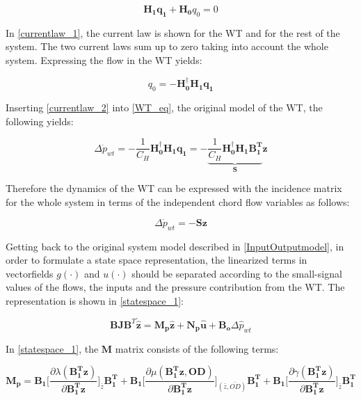 \begin{equation}
 \bm{H_1}\bm{q_1} + \bm{H_0}q_0 = 0 
 \label{currentlaw_1}
\end{equation}

In \eqref{currentlaw_1}, the current law is shown for the WT and for the rest of the system. The two current laws sum up to zero taking into account the whole system. Expressing the flow in the WT yields:

\begin{equation}
q_0 = -\bm{H^{\dagger}_0}\bm{H_1}\bm{q_1}
 \label{currentlaw_2}
\end{equation}

Inserting \eqref{currentlaw_2} into \eqref{WT_eq}, the original model of the WT, the following yields:

\begin{equation}
\Delta \dot{p}_{wt} = - \frac{1}{C_H} \bm{H^{\dagger}_0}\bm{H_1}\bm{q_1} = - \underbrace{\frac{1}{C_H} \bm{H^{\dagger}_0}\bm{H_1}\bm{{B_1^{T}}}}_{\bm{S}} \bm{z}
 \label{currentlaw_3}
\end{equation}

Therefore the dynamics of the WT can be expressed with the incidence matrix for the whole system in terms of the independent chord flow variables as follows: 

\begin{equation}
\Delta \dot{p}_{wt} = - \bm{S} \bm{z}
 \label{currentlaw_4}
\end{equation}

Getting back to the original system model described in \eqref{InputOutputmodel}, in order to formulate a state space representation, the linearized terms in  vectorfields $g(\cdot)$ and $u(\cdot)$ should be separated according to the small-signal values of the flows, the inputs and the pressure contribution from the WT. The representation is shown in \eqref{statespace_1}: 

\begin{equation}
 \bm{B}\bm{J {B}}^T \bm{\dot{\hat{z}}} = \bm{M_p} \bm{\hat{z}} + \bm{N_p} \bm{\hat{u}} + \bm{B_o} \Delta \hat{p}_{wt}    
 \label{statespace_1}
\end{equation}

In \eqref{statespace_1}, the $\bm{M}$ matrix consists of the following terms: 

\begin{equation}
  \bm{M_p} = \bm{B_1} \bigg[ \frac{\partial{\lambda(\bm{{B_1^{T}}}\bm{z})}}{{\partial{\bm{{B_1^{T}}}\bm{z}}}}   \bigg]_{\bar{z}} \bm{{B_1^{T}}} +  \bm{B_1} \bigg[ \frac{\partial{\mu(\bm{{B_1^{T}}}\bm{z}, \bm{OD})}}{{\partial{\bm{{B_1^{T}}}\bm{z}}}}  \bigg]_{(\bar{z}, \bar{OD})} \bm{{B_1^{T}}} +  \bm{B_1} \bigg[ \frac{\partial{\gamma(\bm{{B_1^{T}}}\bm{z})}}{{\partial{\bm{{B_1^{T}}}\bm{z}}}}   \bigg]_{\bar{z}} \bm{{B_1^{T}}}
\label{Amatrix}
\end{equation}

